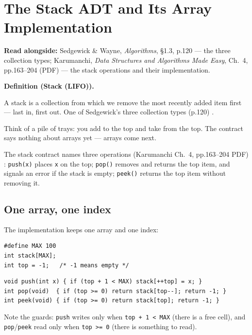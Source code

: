 \documentclass[11pt]{article}
\newenvironment{definitionbox}[1]{%
  \par\noindent\textbf{Definition (#1).}\ \itshape
}{\par\vspace{0.3em}}
\begin{document}
\section{The Stack ADT and Its Array Implementation}

\textbf{Read alongside:} Sedgewick \& Wayne, \textit{Algorithms}, \S1.3, p.120 --- the three collection types; Karumanchi, \textit{Data Structures and Algorithms Made Easy}, Ch.~4, pp.163--204 (PDF) --- the stack operations and their implementation.

\begin{definitionbox}{Stack (LIFO)}
A stack is a collection from which we remove the most recently added item first --- last in, first out. One of Sedgewick's three collection types (p.120) \cite{Sedgewick2011_algorithms}.
\end{definitionbox}

Think of a pile of trays: you add to the top and take from the top. The contract says nothing about arrays yet --- arrays come next. 

The stack contract names three operations (Karumanchi Ch.~4, pp.163--204 PDF) \cite{Karumanchi2017_data_structures_algorithms_made_easy}: \texttt{push(x)} places \texttt{x} on the top; \texttt{pop()} removes and returns the top item, and signals an error if the stack is empty; \texttt{peek()} returns the top item without removing it. 

\subsection{One array, one index}

The implementation keeps one array and one index:
{\footnotesize
\begin{verbatim}
#define MAX 100
int stack[MAX];
int top = -1;   /* -1 means empty */
\end{verbatim}
}
{\footnotesize
\begin{verbatim}
void push(int x) { if (top + 1 < MAX) stack[++top] = x; }
int pop(void)  { if (top >= 0) return stack[top--]; return -1; }
int peek(void) { if (top >= 0) return stack[top]; return -1; }
\end{verbatim}
}
 Note the guards: \texttt{push} writes only when \texttt{top + 1 < MAX} (there is a free cell), and \texttt{pop}/\texttt{peek} read only when \texttt{top >= 0} (there is something to read).
\end{document}
